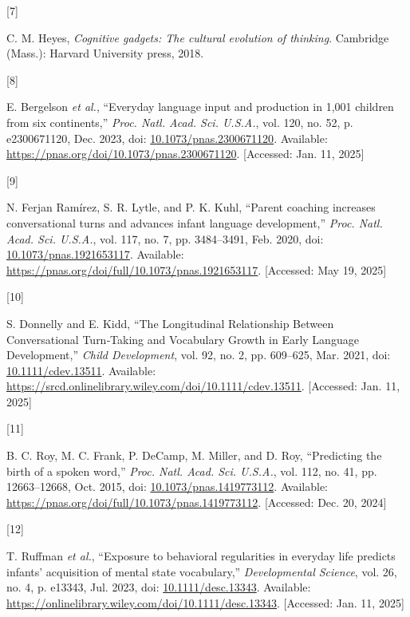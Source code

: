 \documentclass[
  man,floatsintext]{apa6}
\newlength{\cslhangindent}
\newlength{\csllabelwidth}
\newenvironment{CSLReferences}[2] %
 {\begin{list}{}{%
  \setlength{\itemindent}{0pt}
  \setlength{\leftmargin}{0pt}
  \setlength{\parsep}{0pt}
  \ifodd #1
   \setlength{\leftmargin}{\cslhangindent}
   \setlength{\itemindent}{-1\cslhangindent}
  \fi
  \setlength{\itemsep}{#2\baselineskip}}}
 {\end{list}}
\newcommand{\CSLLeftMargin}[1]{\parbox[t]{\csllabelwidth}{\strut#1\strut}}
\newcommand{\CSLRightInline}[1]{\parbox[t]{\linewidth - \csllabelwidth}{\strut#1\strut}}
\begin{document}
\begin{CSLReferences}{0}{0}
\CSLLeftMargin{{[}7{]} }%
\CSLRightInline{C. M. Heyes, \emph{Cognitive gadgets: The cultural evolution of thinking}. Cambridge (Mass.): Harvard University press, 2018.}

\CSLLeftMargin{{[}8{]} }%
\CSLRightInline{E. Bergelson \emph{et al.}, {``Everyday language input and production in 1,001 children from six continents,''} \emph{Proc. Natl. Acad. Sci. U.S.A.}, vol. 120, no. 52, p. e2300671120, Dec. 2023, doi: \href{https://doi.org/10.1073/pnas.2300671120}{10.1073/pnas.2300671120}. Available: \url{https://pnas.org/doi/10.1073/pnas.2300671120}. {[}Accessed: Jan. 11, 2025{]}}

\CSLLeftMargin{{[}9{]} }%
\CSLRightInline{N. Ferjan Ramírez, S. R. Lytle, and P. K. Kuhl, {``Parent coaching increases conversational turns and advances infant language development,''} \emph{Proc. Natl. Acad. Sci. U.S.A.}, vol. 117, no. 7, pp. 3484--3491, Feb. 2020, doi: \href{https://doi.org/10.1073/pnas.1921653117}{10.1073/pnas.1921653117}. Available: \url{https://pnas.org/doi/full/10.1073/pnas.1921653117}. {[}Accessed: May 19, 2025{]}}

\CSLLeftMargin{{[}10{]} }%
\CSLRightInline{S. Donnelly and E. Kidd, {``The {Longitudinal Relationship Between Conversational Turn}‐{Taking} and {Vocabulary Growth} in {Early Language Development},''} \emph{Child Development}, vol. 92, no. 2, pp. 609--625, Mar. 2021, doi: \href{https://doi.org/10.1111/cdev.13511}{10.1111/cdev.13511}. Available: \url{https://srcd.onlinelibrary.wiley.com/doi/10.1111/cdev.13511}. {[}Accessed: Jan. 11, 2025{]}}

\CSLLeftMargin{{[}11{]} }%
\CSLRightInline{B. C. Roy, M. C. Frank, P. DeCamp, M. Miller, and D. Roy, {``Predicting the birth of a spoken word,''} \emph{Proc. Natl. Acad. Sci. U.S.A.}, vol. 112, no. 41, pp. 12663--12668, Oct. 2015, doi: \href{https://doi.org/10.1073/pnas.1419773112}{10.1073/pnas.1419773112}. Available: \url{https://pnas.org/doi/full/10.1073/pnas.1419773112}. {[}Accessed: Dec. 20, 2024{]}}

\CSLLeftMargin{{[}12{]} }%
\CSLRightInline{T. Ruffman \emph{et al.}, {``Exposure to behavioral regularities in everyday life predicts infants' acquisition of mental state vocabulary,''} \emph{Developmental Science}, vol. 26, no. 4, p. e13343, Jul. 2023, doi: \href{https://doi.org/10.1111/desc.13343}{10.1111/desc.13343}. Available: \url{https://onlinelibrary.wiley.com/doi/10.1111/desc.13343}. {[}Accessed: Jan. 11, 2025{]}}


\end{CSLReferences}
\end{document}

